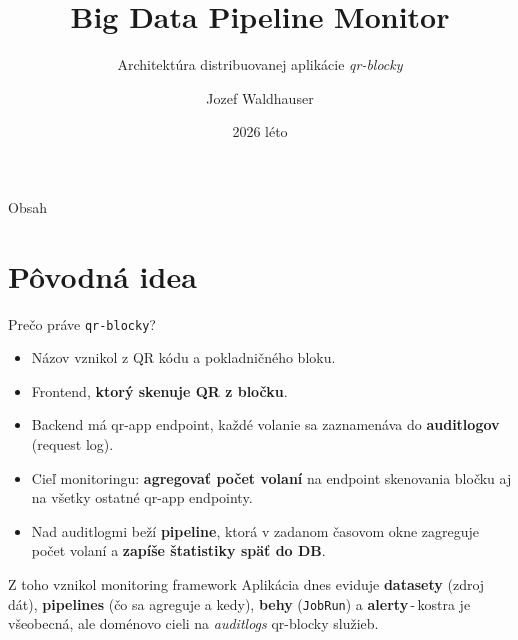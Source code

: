 \documentclass[aspectratio=169,11pt]{beamer}
\title[Big Data Pipeline Monitor]{Big Data Pipeline Monitor}
\subtitle{Architektúra distribuovanej aplikácie \emph{qr-blocky}}
\author{Jozef Waldhauser}
\institute{MSWA}
\date{2026 léto}
\begin{document}
\begin{frame}
  \titlepage
\end{frame}

\begin{frame}{Obsah}
	\tableofcontents
\end{frame}

\section{Pôvodná idea}
\begin{frame}{Prečo práve \texttt{qr-blocky}?}
  \begin{itemize}
    \item Názov vznikol z QR kódu a pokladničného bloku.
    \item Frontend, \textbf{ktorý skenuje QR z bločku}.
    \item Backend má qr-app endpoint, každé volanie sa zaznamenáva do \textbf{auditlogov} (request log).
    \item Cieľ monitoringu: \textbf{agregovať počet volaní} na endpoint skenovania bločku aj na všetky ostatné qr-app endpointy.
    \item Nad auditlogmi beží \textbf{pipeline}, ktorá v zadanom časovom okne zagreguje počet volaní a \textbf{zapíše štatistiky späť do DB}.
  \end{itemize}
  \vfill
  \begin{block}{Z toho vznikol monitoring framework}
    Aplikácia dnes eviduje \textbf{datasety} (zdroj dát), \textbf{pipelines} (čo sa agreguje a kedy), \textbf{behy} (\texttt{JobRun}) a \textbf{alerty}\,-\,kostra je všeobecná, ale doménovo cieli na \emph{auditlogs} qr-blocky služieb.
  \end{block}
\end{frame}

\end{document}
